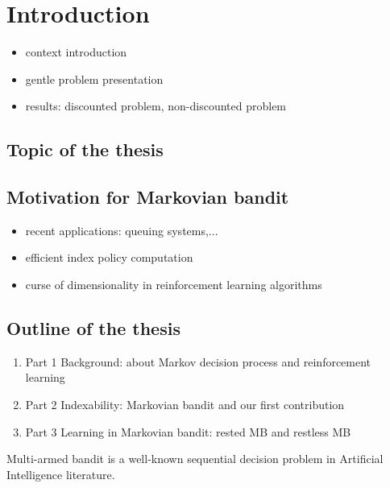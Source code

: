 \chapter{Introduction}
\label{chapter:introduction}

\begin{itemize}
    \item context introduction
    \item gentle problem presentation
    \item results: discounted problem, non-discounted problem
\end{itemize}

\section{Topic of the thesis}

\section{Motivation for Markovian bandit}

\begin{itemize}
    \item recent applications: queuing systems,...
    \item efficient index policy computation
    \item curse of dimensionality in reinforcement learning algorithms
\end{itemize}

\section{Outline of the thesis}

\begin{enumerate}
    \item Part 1 Background: about Markov decision process and reinforcement learning
    \item Part 2 Indexability: Markovian bandit and our first contribution
    \item Part 3 Learning in Markovian bandit: rested MB and restless MB
\end{enumerate}

Multi-armed bandit is a well-known sequential decision problem in Artificial Intelligence literature.

%
